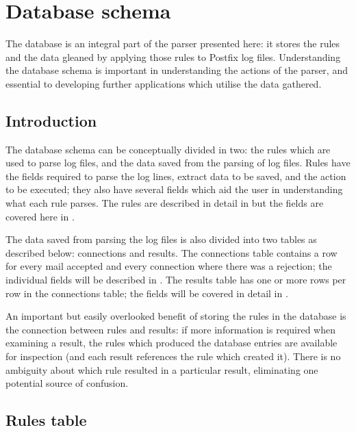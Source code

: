 \section{Database schema}
\label{database schema}

The database is an integral part of the parser presented here: it stores
the rules and the data gleaned by applying those rules to Postfix log
files.  Understanding the database schema is important in understanding the
actions of the parser, and essential to developing further applications
which utilise the data gathered.

\subsection{Introduction}

The database schema can be conceptually divided in two: the rules which are
used to parse log files, and the data saved from the parsing of log files.
Rules have the fields required to parse the log lines, extract data to be
saved, and the action to be executed; they also have several fields which
aid the user in understanding what each rule parses.  The rules are
described in detail in  but the fields are covered here
in .

The data saved from parsing the log files is also divided into two tables
as described below: connections and results.  The connections table
contains a row for every mail accepted and every connection where there was
a rejection; the individual fields will be described in
.  The results table has one or more rows per
row in the connections table; the fields will be covered in detail in
.

An important but easily overlooked benefit of storing the rules in the
database is the connection between rules and results: if more information
is required when examining a result, the rules which produced the database
entries are available for inspection (and each result references the rule
which created it).  There is no ambiguity about which rule resulted in a
particular result, eliminating one potential source of confusion.

\subsection{Rules table}

\label{rule attributes}

